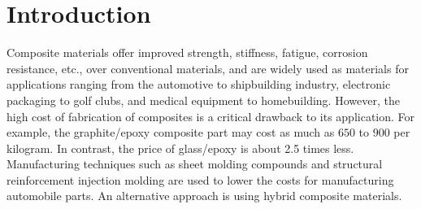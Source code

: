 \documentclass[10pt, journal]{IEEEtran}
\begin{document}
\section{Introduction}
Composite materials offer improved strength, stiffness, fatigue, corrosion resistance, etc., over
conventional materials, and are widely used as materials for applications ranging from the automotive to shipbuilding
industry, electronic packaging to golf clubs, and medical equipment to homebuilding. However, the high
cost of fabrication of composites is a critical drawback to its application. For example, the
graphite/epoxy composite part may cost as much as $650$ to $900$ per kilogram. In contrast, the price
of glass/epoxy is about 2.5 times less. Manufacturing techniques such as sheet molding compounds and
structural reinforcement injection molding are used to lower the costs for manufacturing automobile parts.
An alternative approach is using hybrid composite materials.
\end{document}
